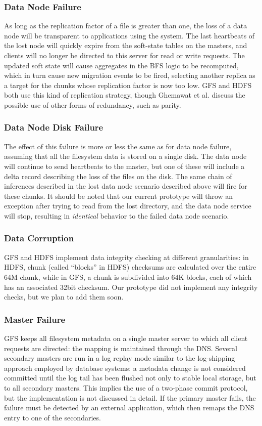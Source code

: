 \documentclass{article}
\begin{document}
\subsubsection{Data Node Failure}
As long as the replication factor of a file is greater than one, the
loss of a data node will be transparent to applications using the
system.  The last heartbeats of the lost node will quickly expire from
the soft-state tables on the masters, and clients will no longer be
directed to this server for read or write requests.  The updated soft
state will cause aggregates in the BFS logic to be recomputed, which
in turn cause new migration events to be fired, selecting another
replica as a target for the chunks whose replication factor is now too
low.  GFS and HDFS both use this kind of replication strategy, though
Ghemawat et al. discuss the possible use of other forms of redundancy,
such as parity.

\subsubsection{Data Node Disk Failure}
The effect of this failure is more or less the same as for data node
failure, assuming that all the filesystem data is stored on a single
disk.  The data node will continue to send heartbeats to the master,
but one of these will include a delta record describing the loss of
the files on the disk.  The same chain of inferences described in the
lost data node scenario described above will fire for these chunks.
It should be noted that our current prototype will throw an exception
after trying to read from the lost directory, and the data node
service will stop, resulting in \emph{identical} behavior to the
failed data node scenario.

\subsubsection{Data Corruption}
GFS and HDFS implement data integrity checking at different
granularities: in HDFS, chunk (called ``blocks'' in HDFS) checksums
are calculated over the entire 64M chunk, while in GFS, a chunk is
subdivided into 64K blocks, each of which has an associated 32bit
checksum.  Our prototype did not implement any integrity checks, but
we plan to add them soon.

\subsubsection{Master Failure}
GFS keeps all filesystem metadata on a single master server to which
all client requests are directed: the mapping is maintained through
the DNS.  Several secondary masters are run in a log replay mode
similar to the log-shipping approach employed by database systems: a
metadata change is not considered committed until the log tail has
been flushed not only to stable local storage, but to all secondary
masters.  This implies the use of a two-phase commit protocol, but the
implementation is not discussed in detail.  If the primary master
fails, the failure must be detected by an external application, which
then remaps the DNS entry to one of the secondaries.
 
\end{document}
